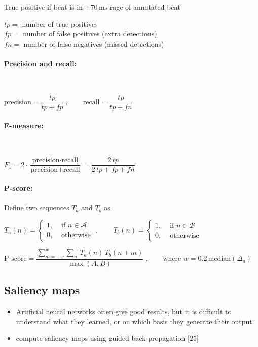 \documentclass{article}
\begin{document}
True positive if beat is in $\pm 70\,\text{ms}$ rage of annotated beat

$tp =$ number of true positives \\
$fp =$ number of false positives (extra detections) \\
$fn =$ number of false negatives (missed detections) 

\paragraph{Precision and recall:} $ $

$\text{precision} = \dfrac{tp}{tp + fp}\;, \qquad \text{recall} = \dfrac{tp}{tp + fn}$


\paragraph{F-measure:} $ $

$F_1 = 2 \cdot \dfrac{\text{precision} \cdot \text{recall}}{\text{precision} + \text{recall}} = \dfrac{2\, tp}{2\, tp + fp + fn}$

\paragraph{P-score:} Define two sequences $T_a$ and $T_b$ as 

$T_a(n) = \begin{cases}
	1, &\text{ if } n \in \mathcal A \\
	0 , & \text{ otherwise }
\end{cases}, \qquad T_b(n) = \begin{cases}
	1, &\text{ if } n \in \mathcal B \\
	0 , & \text{ otherwise }
\end{cases}$

$\text{P-score} = \dfrac{\displaystyle \sum_{m=-w}^w  \sum_{n}\,  T_a(n)\,  T_b(n+m)}{\max(A,B)} \;, \qquad \text{where } w = 0.2 \, \text{median}(\Delta_a)$ 



\subsection{Saliency maps}

\begin{itemize}
\item Artificial neural networks often give good results, but it is difficult to understand what they learned, or on which basis they generate their output.
\item compute saliency maps using guided back-propagation [25]
\end{itemize}
\end{document}
